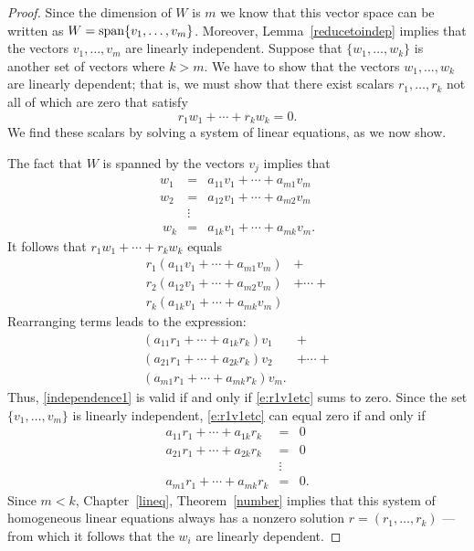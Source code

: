 \documentclass{ximera}
\begin{document}
\begin{proof} Since the dimension of $W$ is $m$ we know that
this vector space can be written as $W={\rm span}\{v_1,\ldots,v_m\}$.
Moreover, Lemma~\ref{reducetoindep} implies that the vectors
$v_1,\ldots,v_m$ are linearly independent.  Suppose that
$\{w_1,\ldots,w_k\}$ is another set of vectors where $k>m$.
We have to show that the vectors $w_1,\ldots,w_k$ are linearly
dependent; that is, we must show that there exist scalars
$r_1,\ldots,r_k$ not all of which are zero that satisfy
\begin{equation} \label{independence1}
r_1w_1 + \cdots + r_kw_k = 0.
\end{equation}
We find these scalars by solving a system of linear equations, as
we now show.

The fact that $W$ is spanned by the vectors $v_j$ implies that
\begin{eqnarray*}
w_1 & = & a_{11}v_1 + \cdots + a_{m1}v_m\ \\
w_2 & = & a_{12}v_1 + \cdots + a_{m2}v_m\ \\
 & \vdots & \\\
w_k & = & a_{1k}v_1 + \cdots + a_{mk}v_m.
\end{eqnarray*}
It follows that $r_1w_1 + \cdots + r_kw_k$ equals
\[
\begin{array}{ll}
r_1(a_{11}v_1 + \cdots + a_{m1}v_m) & +  \\
r_2(a_{12}v_1 + \cdots + a_{m2}v_m) & + \cdots + \\
r_k(a_{1k}v_1 + \cdots + a_{mk}v_m) &
\end{array}
\]
Rearranging terms leads to the expression:
\begin{equation}   \label{e:r1v1etc}
\begin{array}{ll}
(a_{11}r_1 + \cdots + a_{1k}r_k)v_1\ & + \\
(a_{21}r_1 + \cdots + a_{2k}r_k)v_2\ & + \cdots + \\
(a_{m1}r_1 + \cdots + a_{mk}r_k)v_m. &
\end{array}
\end{equation}
Thus, \eqref{independence1} is valid if and only if \eqref{e:r1v1etc}
sums to zero.  Since the set $\{v_1,\ldots,v_m\}$ is linearly
independent, \eqref{e:r1v1etc} can equal zero if and only if
\begin{eqnarray*}
a_{11}r_1 + \cdots + a_{1k}r_k & = & 0\ \\
a_{21}r_1 + \cdots + a_{2k}r_k & = & 0\ \\
          & \vdots &   \\
a_{m1}r_1 + \cdots + a_{mk}r_k & = & 0.
\end{eqnarray*}
Since $m<k$, Chapter~\ref{lineq}, Theorem~\ref{number} implies that
this system of homogeneous linear equations always has a nonzero
solution $r=(r_1,\ldots,r_k)$ --- from which it follows that the
$w_i$ are linearly dependent.  \end{proof}
\end{document}
